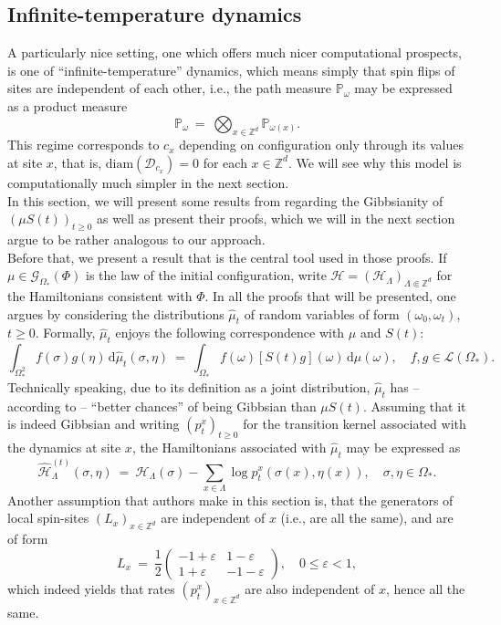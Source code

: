 \documentclass[12pt]{article}
\newcommand{\D}{\mathcal{D}}
\renewcommand{\d}{\mathrm{d}}
\newcommand{\G}{\mathcal{G}}
\renewcommand{\H}{\mathcal{H}}
\newcommand{\Loc}{\mathcal{L}}
\renewcommand{\P}{\mathbb{P}}
\newcommand{\Z}{\mathbb{Z}}
\newcommand{\1}{\mathbbm{1}}
\newcommand{\5}{\vspace{0.5cm}}
\renewcommand{\hat}{\widehat}
\theoremstyle{definition}
\begin{document}

\subsection{Infinite-temperature dynamics}

A particularly nice setting, one which offers much nicer computational prospects, is one of ``infinite-temperature'' dynamics, which means simply that spin flips of sites are independent of each other, i.e., the path measure $\P_\omega$ may be expressed as a product measure
$$\P_\omega ~=~ \bigotimes_{x\in\Z^d}\P_{\omega(x)}.$$
This regime corresponds to $c_x$ depending on configuration only through its values at site $x$, that is, $\mathrm{diam}(\D_{c_x})=0$ for each $x\in\Z^d$. We will see why this model is computationally much simpler in the next section. \\

In this section, we will present some results from \cite{EFHR} regarding the Gibbsianity of $(\mu S(t))_{t\geq 0}$ as well as present their proofs, which we will in the next section argue to be rather analogous to our approach. \\

Before that, we present a result that is the central tool used in those proofs. If $\mu\in\G_{\Omega_*}(\Phi)$ is the law of the initial configuration, write $\H=(\H_\Lambda)_{\Lambda\Subset\Z^d}$ for the Hamiltonians consistent with $\Phi$. In all the proofs that will be presented, one argues by considering the distributions $\hat{\mu}_t$ of random variables of form $(\omega_0,\omega_t)$, $t\geq 0$. Formally, $\hat{\mu}_t$ enjoys the following correspondence with $\mu$ and $S(t)$:
$$\int_{\Omega_*^2} f(\sigma)g(\eta)\,\d\hat{\mu}_t(\sigma,\eta) ~=~ \int_{\Omega_*}f(\omega)[S(t)g](\omega)\,\d\mu(\omega), \quad f,g\in\Loc(\Omega_*).$$
Technically speaking, due to its definition as a joint distribution, $\hat{\mu}_t$ has -- according to \cite{EFHR} -- ``better chances'' of being Gibbsian than $\mu S(t)$. Assuming that it is indeed Gibbsian and writing $(p_t^x)_{t\geq 0}$ for the transition kernel associated with the dynamics at site $x$, the Hamiltonians associated with $\hat{\mu}_t$ may be expressed as
$$\hat{\H}_\Lambda^{(t)}(\sigma,\eta) ~=~ \H_\Lambda(\sigma) - \sum_{x\in\Lambda}\log p_t^x(\sigma(x),\eta(x)), \quad \sigma,\eta\in\Omega_*.$$
Another assumption that authors make in this section is, that the generators of local spin-sites $(L_x)_{x\in\Z^d}$ are independent of $x$ (i.e., are all the same), and are of form
$$L_x ~=~ \frac{1}{2}\begin{pmatrix}
-1+\varepsilon & 1-\varepsilon \\
1+\varepsilon & -1-\varepsilon
\end{pmatrix}, \quad 0\leq \varepsilon<1,$$
which indeed yields that rates $(p_t^x)_{x\in\Z^d}$ are also independent of $x$, hence all the same.\\
\end{document}
